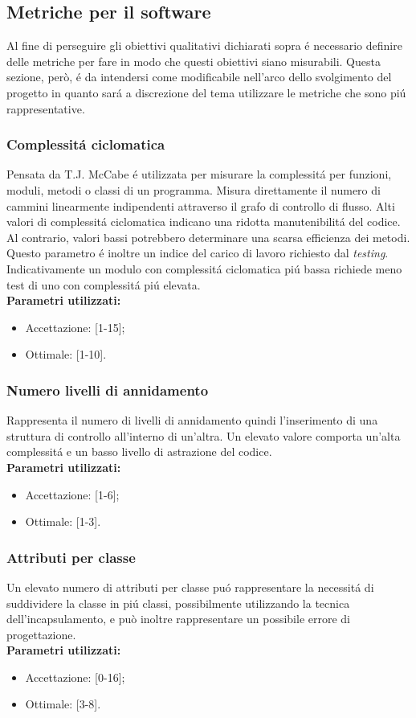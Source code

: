 \subsection{Metriche per il software}
Al fine di perseguire gli obiettivi qualitativi dichiarati sopra \'e necessario definire delle metriche per fare in modo che questi obiettivi siano misurabili. Questa sezione, però, \'e da intendersi come modificabile nell'arco dello svolgimento del progetto in quanto sar\'a a discrezione del tema utilizzare le metriche che sono pi\'u rappresentative.
\subsubsection{Complessit\'a ciclomatica}
Pensata da T.J. McCabe \'e utilizzata per misurare la complessit\'a per funzioni, moduli, metodi o classi di un programma. Misura direttamente il numero di cammini linearmente indipendenti attraverso il grafo di controllo di flusso.
Alti valori di complessit\'a ciclomatica indicano una ridotta manutenibilit\'a del codice. Al contrario, valori bassi potrebbero determinare una scarsa efficienza dei metodi. Questo parametro \'e inoltre un indice del carico di lavoro richiesto dal \textit{testing}. Indicativamente un modulo con complessit\'a ciclomatica pi\'u bassa richiede meno test di uno con complessit\'a pi\'u elevata.\\
\textbf{Parametri utilizzati:}
\begin{itemize}
\item Accettazione: [1-15];
\item Ottimale: [1-10].
\end{itemize}
\subsubsection{Numero livelli di annidamento}
Rappresenta il numero di livelli di annidamento quindi l'inserimento di una struttura di controllo all'interno di un'altra. Un elevato valore comporta un'alta complessit\'a e un basso livello di astrazione del codice.\\
\textbf{Parametri utilizzati:}
\begin{itemize}
\item Accettazione: [1-6];
\item Ottimale: [1-3].
\end{itemize}
\subsubsection{Attributi per classe}
Un elevato numero di attributi per classe pu\'o rappresentare la necessit\'a di suddividere la classe in pi\'u classi, possibilmente utilizzando la tecnica dell'incapsulamento, e può inoltre rappresentare un possibile errore di progettazione.\\
\textbf{Parametri utilizzati:}
\begin{itemize}
\item Accettazione: [0-16];
\item Ottimale: [3-8].
\end{itemize}
